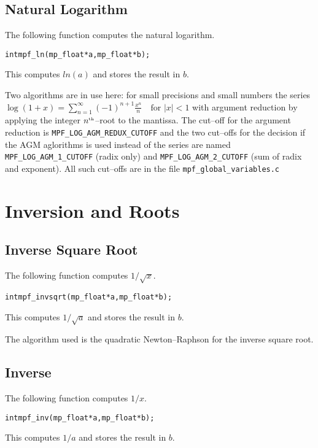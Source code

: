 \documentclass[a4paper]{book}
\theoremstyle{definition}
\theoremstyle{remark}
\begin{document}
\subsection{Natural Logarithm}

The following function computes the natural logarithm.
\begin{alltt}
int  mpf_ln(mp_float *a, mp_float *b);
\end{alltt}
This computes $ln(a)$ and stores the result in $b$.

Two algorithms are in use here: for small precisions and small numbers the series $\log(1+x) = \sum^\infty_{n=1}(-1)^{n+1}\frac{x^n}{n}\quad\text{for } |x| < 1$  with argument reduction by applying the integer $n^{\text{\tiny th}}$--root to the mantissa. The cut--off for the argument reduction is {\texttt{MPF\_LOG\_AGM\_REDUX\_CUTOFF}} and the two cut--offs for the decision if the AGM aglorithms is used instead of the series are named {\texttt{MPF\_LOG\_AGM\_1\_CUTOFF}} (radix only) and  {\texttt{MPF\_LOG\_AGM\_2\_CUTOFF}} (sum of radix and exponent). All such cut--offs are in the file {\texttt{mpf\_global\_variables.c}}

\section{Inversion and Roots}

\subsection{Inverse Square Root}
The following function computes $1 / \sqrt{x}$.

\begin{alltt}
int  mpf_invsqrt(mp_float *a, mp_float *b);
\end{alltt}

This computes $1 / \sqrt{a}$ and stores the result in $b$.

The algorithm used is the quadratic Newton--Raphson for the inverse square root.

\subsection{Inverse}

The following function computes $1 / x$.
\begin{alltt}
int  mpf_inv(mp_float *a, mp_float *b);
\end{alltt}
This computes $1/a$ and stores the result in $b$.
\end{document}
